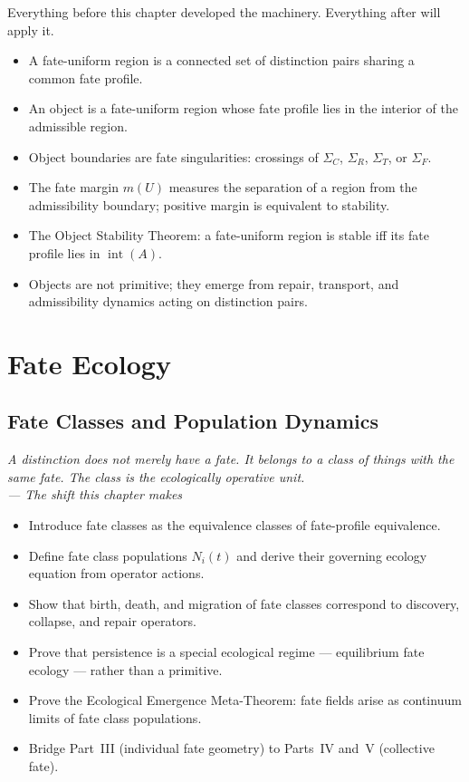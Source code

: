 \documentclass[12pt,twoside,openright]{book}
\newcommand{\strataC}{\Sigma_{C}}   %
\newcommand{\strataR}{\Sigma_{R}}   %
\newcommand{\strataT}{\Sigma_{T}}   %
\newcommand{\strataF}{\Sigma_{F}}   %
\newcommand{\admRegion}{A}
\newenvironment{epigraph}[2]{%
  \vspace{1em}\begin{flushright}
  \begin{minipage}{0.72\textwidth}
  \itshape\small #1\\[0.4em]
  \upshape\footnotesize\sffamily\color{DistGray}--- #2
  \end{minipage}\end{flushright}\vspace{1.5em}}{}
\newenvironment{objectives}{%
  \begin{tcolorbox}[colback=DistBlue!5,colframe=DistBlue,
    title={\faCheckCircle\enspace Chapter Objectives},
    fonttitle=\sffamily\bfseries\color{white},
    attach boxed title to top left={yshift=-2mm,xshift=4mm},
    boxed title style={colback=DistBlue},breakable]
  \begin{itemize}[leftmargin=*,nosep]}{%
  \end{itemize}\end{tcolorbox}\vspace{1em}}
\newenvironment{chapsummary}{%
  \begin{tcolorbox}[colback=DistBlue!5,colframe=DistBlue,
    title={\faBookOpen\enspace Summary},
    fonttitle=\sffamily\bfseries\color{white},
    attach boxed title to top left={yshift=-2mm,xshift=4mm},
    boxed title style={colback=DistBlue,rounded corners}]
  \begin{itemize}[nosep,leftmargin=*]}{%
  \end{itemize}\end{tcolorbox}}
\providecommand{\strataC}{\Sigma_{C}}
\providecommand{\strataR}{\Sigma_{R}}
\providecommand{\strataT}{\Sigma_{T}}
\providecommand{\strataF}{\Sigma_{F}}
\providecommand{\admRegion}{A}
\begin{document}
Everything before this chapter developed the machinery.
Everything after will apply it.

\begin{chapsummary}
\item A fate-uniform region is a connected set of distinction
  pairs sharing a common fate profile.
\item An object is a fate-uniform region whose fate profile
  lies in the interior of the admissible region.
\item Object boundaries are fate singularities: crossings of
  $\strataC$, $\strataR$, $\strataT$, or $\strataF$.
\item The fate margin $m(U)$ measures the separation of a
  region from the admissibility boundary; positive margin is
  equivalent to stability.
\item The Object Stability Theorem: a fate-uniform region is
  stable iff its fate profile lies in $\operatorname{int}(\admRegion)$.
\item Objects are not primitive; they emerge from repair,
  transport, and admissibility dynamics acting on distinction
  pairs.
\end{chapsummary}

\part{Fate Ecology}
\chapter{Fate Classes and Population Dynamics}
\label{ch:fate-classes}

\begin{epigraph}{A distinction does not merely have a fate.
  It belongs to a class of things with the same fate. The
  class is the ecologically operative unit.}{The shift this
  chapter makes}
\end{epigraph}

\begin{objectives}
\item Introduce fate classes as the equivalence classes of
  fate-profile equivalence.
\item Define fate class populations $N_i(t)$ and derive
  their governing ecology equation from operator actions.
\item Show that birth, death, and migration of fate classes
  correspond to discovery, collapse, and repair operators.
\item Prove that persistence is a special ecological regime
  --- equilibrium fate ecology --- rather than a primitive.
\item Prove the Ecological Emergence Meta-Theorem: fate fields
  arise as continuum limits of fate class populations.
\item Bridge Part~III (individual fate geometry) to Parts~IV
  and~V (collective fate).
\end{objectives}
\end{document}
